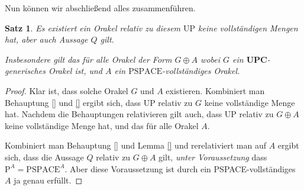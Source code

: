 \documentclass[nofonts]{uebung}
\newtheorem{theorem}{Satz}
\theoremstyle{definition}
\def\P{\ensuremath{\mathrm{P}}}
\def\UP{\ensuremath{\mathrm{UP}}}
\def\PSPACE{\ensuremath{\mathrm{PSPACE}}}
\begin{document}
Nun können wir abschließend alles zusammenführen.
\begin{theorem}
    Es existiert ein Orakel relativ zu diesem $\UP$ keine vollständigen Mengen hat, aber auch Aussage $Q$ gilt.

    Insbesondere gilt das für alle Orakel der Form $G\oplus A$ wobei $G$ ein $\mathbf{UPC}$-generisches Orakel ist, und $A$ ein $\PSPACE$-vollständiges Orakel.
\end{theorem}
\begin{proof}
    Klar ist, dass solche Orakel $G$ und $A$ existieren.
    Kombiniert man Behauptung \ref{} und \ref{} ergibt sich, dass $\UP$ relativ zu $G$ keine vollständige Menge hat.
    Nachdem die Behauptungen relativieren gilt auch, dass $\UP$ relativ zu $G\oplus A$ keine vollständige Menge hat, und das für alle Orakel $A$.

    Kombiniert man Behauptung \ref{} und Lemma \ref{} und rerelativiert man auf $A$ ergibt sich, dass die Aussage $Q$ relativ zu $G\oplus A$ gilt, \emph{unter Voraussetzung} dass $\P^A=\PSPACE^A$.
    Aber diese Voraussetzung ist durch ein PSPACE-vollständiges $A$ ja genau erfüllt.
\end{proof}


\printbibliography[heading=subbibliography]

\endrefsection
\end{document}
